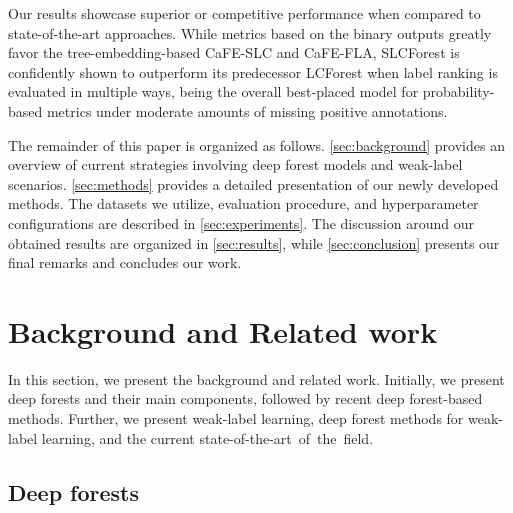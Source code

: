 \documentclass[conference,compsoc]{IEEEtran}
\begin{document}
Our results showcase superior or competitive performance when compared to state-of-the-art approaches. While metrics based on the binary outputs greatly favor the tree-embedding-based CaFE-SLC and CaFE-FLA, SLCForest is confidently shown to outperform its predecessor LCForest \cite{wang2020learning} when label ranking is evaluated in multiple ways, being the overall best-placed model for probability-based metrics under moderate amounts of missing positive annotations.

The remainder of this paper is organized as follows. \autoref{sec:background} provides an overview of current strategies involving deep forest models and weak-label scenarios. \autoref{sec:methods} provides a detailed presentation of our newly developed methods. The datasets we utilize, evaluation procedure, and hyperparameter configurations are described in \autoref{sec:experiments}. The discussion around our obtained results are organized in \autoref{sec:results}, while \autoref{sec:conclusion} presents our final remarks and concludes our work. 



\section{Background and Related work}
\label{sec:background}
In this section, we present the background and related work. Initially, we present deep forests and their main components, followed by recent deep forest-based methods. Further, we present weak-label learning, deep forest methods for weak-label learning, and the current state-of-the-art~of~the~field.

\subsection{Deep forests}
\label{sec:deep forests}

%
\end{document}
